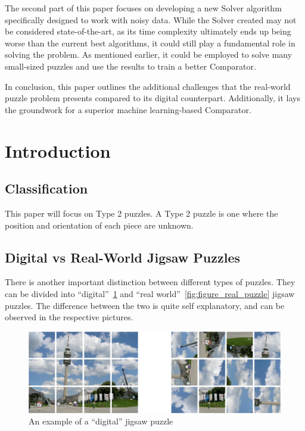 \documentclass{article}
\begin{document}
The second part of this paper focuses on developing a
new Solver algorithm specifically designed to work with noisy data.
While the Solver created may not be considered state-of-the-art,
as its time complexity ultimately ends up being worse than the current
best algorithms, it could still play a fundamental role in solving the problem.
As mentioned earlier, it could be employed to solve many small-sized
puzzles and use the results to train a better Comparator.

In conclusion, this paper outlines the additional challenges that the real-world
puzzle problem presents compared to its digital counterpart.
Additionally, it lays the groundwork for a superior machine learning-based Comparator.

\section{Introduction}
\subsection{Classification}
This paper will focus on Type 2 puzzles. A Type 2 puzzle is one where the position and orientation of each piece are unknown.
\subsection{Digital vs Real-World Jigsaw Puzzles}

There is  another important distinction between different types of puzzles.
They can be divided into “digital”~\ref{fig:figure_digital_puzzle} and “real world”~\ref{fig:figure_real_puzzle} jigsaw puzzles.
The difference between the two is quite self explanatory, and can be observed in the respective pictures.
\label{document:DigitalVSReal}

\begin{figure}[H]
    \caption{An example of a “digital” jigsaw  puzzle}\label{fig:figure_digital_puzzle}
    \centering
    \includegraphics[height=0.25\textwidth]{pictures/digital_puzzle.png}
\end{figure}
\end{document}
